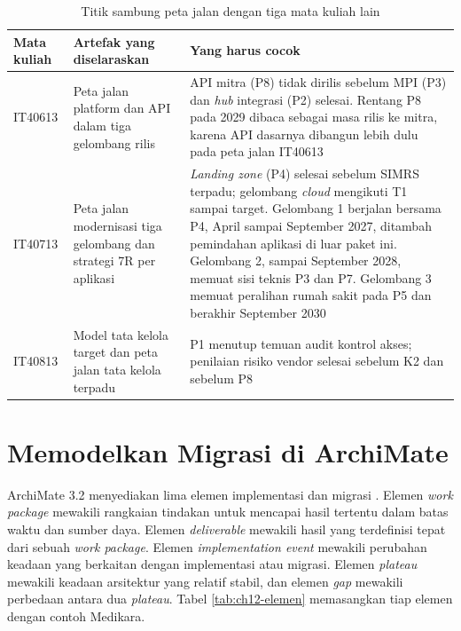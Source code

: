 \begin{table}[!htb]
  \centering
  \caption{Titik sambung peta jalan dengan tiga mata kuliah lain}
  \label{tab:ch12-selaras}
  \begin{tabularx}{\textwidth}{>{\raggedright\arraybackslash}p{1.6cm}
                               >{\raggedright\arraybackslash}X
                               >{\raggedright\arraybackslash}X}
    \hline
    \textbf{Mata kuliah} & \textbf{Artefak yang diselaraskan} &
      \textbf{Yang harus cocok} \\
    \hline
    IT40613 & Peta jalan platform dan API dalam tiga gelombang rilis & API
      mitra (P8) tidak dirilis sebelum MPI (P3) dan \textit{hub} integrasi (P2)
      selesai. Rentang P8 pada 2029 dibaca sebagai masa rilis ke mitra, karena API
      dasarnya dibangun lebih dulu pada peta jalan IT40613 \\
    \hline
    IT40713 & Peta jalan modernisasi tiga gelombang dan strategi 7R per
      aplikasi & \textit{Landing zone} (P4) selesai sebelum SIMRS terpadu;
      gelombang \textit{cloud} mengikuti T1 sampai target. Gelombang 1 berjalan
      bersama P4, April sampai September 2027, ditambah pemindahan aplikasi di
      luar paket ini. Gelombang 2, sampai September 2028, memuat sisi teknis P3
      dan P7. Gelombang 3 memuat peralihan rumah sakit pada P5 dan berakhir
      September 2030 \\
    \hline
    IT40813 & Model tata kelola target dan peta jalan tata kelola terpadu &
      P1 menutup temuan audit kontrol akses; penilaian risiko vendor selesai
      sebelum K2 dan sebelum P8 \\
    \hline
  \end{tabularx}
\end{table}

\section{Memodelkan Migrasi di ArchiMate}

ArchiMate 3.2 menyediakan lima elemen implementasi dan migrasi
\cite{archimate32}. Elemen \textit{work package} mewakili rangkaian tindakan
untuk mencapai hasil tertentu dalam batas waktu dan sumber daya. Elemen
\textit{deliverable} mewakili hasil yang terdefinisi tepat dari sebuah
\textit{work package}. Elemen \textit{implementation event} mewakili perubahan
keadaan yang berkaitan dengan implementasi atau migrasi. Elemen
\textit{plateau} mewakili keadaan arsitektur yang relatif stabil, dan elemen
\textit{gap} mewakili perbedaan antara dua \textit{plateau}. Tabel
\ref{tab:ch12-elemen} memasangkan tiap elemen dengan contoh Medikara.

